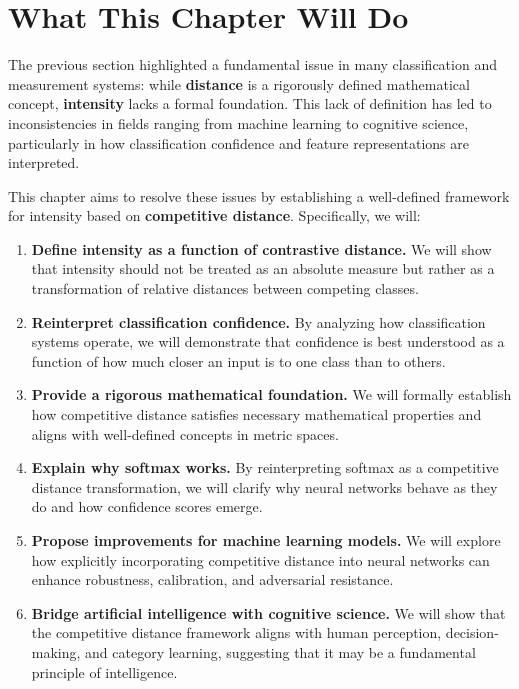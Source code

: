 \section{What This Chapter Will Do}

The previous section highlighted a fundamental issue in many classification and measurement systems: while \textbf{distance} is a rigorously defined mathematical concept, \textbf{intensity} lacks a formal foundation. This lack of definition has led to inconsistencies in fields ranging from machine learning to cognitive science, particularly in how classification confidence and feature representations are interpreted.

This chapter aims to resolve these issues by establishing a well-defined framework for intensity based on \textbf{competitive distance}. Specifically, we will:

\begin{enumerate}
    \item \textbf{Define intensity as a function of contrastive distance.} We will show that intensity should not be treated as an absolute measure but rather as a transformation of relative distances between competing classes.
    \item \textbf{Reinterpret classification confidence.} By analyzing how classification systems operate, we will demonstrate that confidence is best understood as a function of how much closer an input is to one class than to others.
    \item \textbf{Provide a rigorous mathematical foundation.} We will formally establish how competitive distance satisfies necessary mathematical properties and aligns with well-defined concepts in metric spaces.
    \item \textbf{Explain why softmax works.} By reinterpreting softmax as a competitive distance transformation, we will clarify why neural networks behave as they do and how confidence scores emerge.
    \item \textbf{Propose improvements for machine learning models.} We will explore how explicitly incorporating competitive distance into neural networks can enhance robustness, calibration, and adversarial resistance.
    \item \textbf{Bridge artificial intelligence with cognitive science.} We will show that the competitive distance framework aligns with human perception, decision-making, and category learning, suggesting that it may be a fundamental principle of intelligence.
\end{enumerate}

